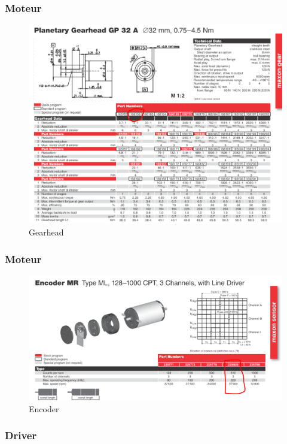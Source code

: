 \begin{frame}
\frametitle{Moteur}
\begin{figure}[!ht]
	\centering
	\includegraphics[scale=0.6]{Gearhead.PNG}
	\caption{Gearhead}
\end{figure}
\end{frame}

\begin{frame}
\frametitle{Moteur}
\begin{figure}[!ht]
	\centering
	\includegraphics[scale=0.6]{Encoder.PNG}
	\caption{Encoder}
\end{figure}
\end{frame}

\begin{frame}
\frametitle{Driver}
\end{frame}